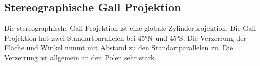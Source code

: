 \subsection{Stereographische Gall Projektion}
Die stereographische Gall Projektion ist eine globale Zylinderprojektion. Die Gall Projektion hat zwei Standartparallelen bei 45°N und 45°S. Die Verzerrung der Fläche und Winkel nimmt mit Abstand zu den Standartparallelen zu. Die Verzerrung ist allgemein an den Polen sehr stark. 